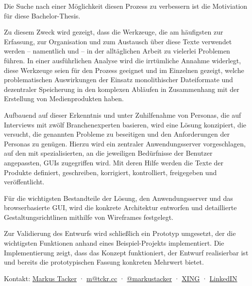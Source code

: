 \documentclass[11pt,a4paper]{article}
\begin{document}
Die Suche nach einer Möglichkeit diesen Prozess zu verbessern ist die Motiviation für diese Bachelor-Thesis. 

Zu diesem Zweck wird gezeigt, dass die Werkzeuge, die am häufigsten zur Erfassung, zur Organisation und zum Austausch über diese Texte verwendet werden -- namentlich  und  -- in der alltäglichen Arbeit zu vielerlei Problemen führen. In einer ausführlichen Analyse wird die irrtümliche Annahme widerlegt, diese Werkzeuge seien für den Prozess geeignet und im Einzelnen gezeigt, welche problematischen Auswirkungen der Einsatz monolithischer Dateiformate und dezentraler Speicherung in den komplexen Abläufen in Zusammenhang mit der Erstellung von Medienprodukten haben.

Aufbauend auf dieser Erkenntnis und unter Zuhilfenahme von Personas, die auf Interviews mit zwölf Branchenexperten basieren, wird eine Lösung konzipiert, die versucht, die genannten Probleme zu beseitigen und den Anforderungen der Personas zu genügen. Hierzu wird ein zentraler Anwendungsserver vorgeschlagen, auf den mit spezialisierten, an die jeweiligen Bedürfnisse der Benutzer angepassten, GUIs zugegriffen wird. Mit deren Hilfe werden die Texte der Produkte definiert, geschreiben, korrigiert, kontrolliert, freigegeben und veröffentlicht.

Für die wichtigsten Bestandteile der Lösung, den Anwendungsserver und das browserbasierte GUI, wird die konkrete Architektur entworfen und detaillierte Gestaltungsrichtlinen mithilfe von Wireframes festgelegt.

Zur Validierung des Entwurfs wird schließlich ein Prototyp umgesetzt, der die wichtigsten Funktionen anhand eines Beispiel-Projekts implementiert. Die Implementierung zeigt, dass das Konzept funktioniert, der Entwurf realisierbar ist und bereits die prototypischen Fassung konkreten Mehrwert bietet.

\begin{center}
\begin{small}
Kontakt: \href{http://tckr.cc/}{Markus Tacker} · \href{mailto:m@tckr.cc}{m@tckr.cc} · \href{http://twitter.com/markustacker}{@markustacker} · \href{https://www.xing.com/profile/Markus_Tacker}{XING} · \href{http://www.linkedin.com/in/markustacker}{LinkedIN}
\end{small}
\end{center}
\end{document}
